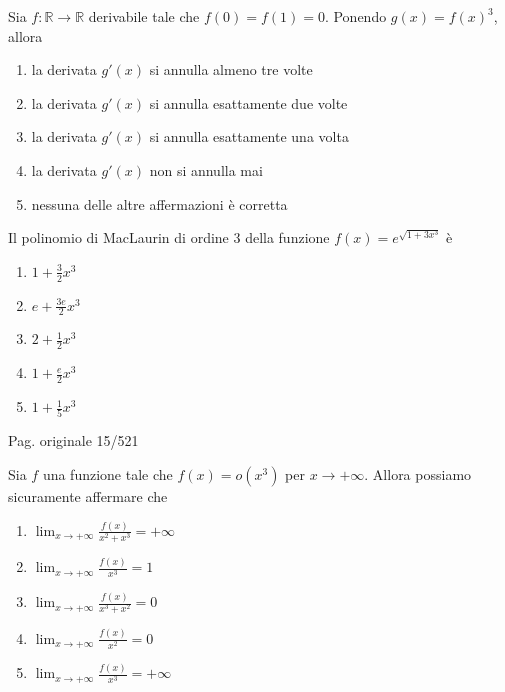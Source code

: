 \begin{quiz}
Sia $f:\mathbb R\to\mathbb R$ derivabile tale che $f(0)=f(1)=0$. Ponendo $g(x)=f(x)^3$, allora
\begin{enumerate}[label=\alph*),leftmargin=1.3cm,itemsep=3pt,topsep=5pt]
\item la derivata $g\prime(x)$ si annulla almeno tre volte
\item la derivata $g\prime(x)$ si annulla esattamente due volte
\item la derivata $g\prime(x)$ si annulla esattamente una volta
\item la derivata $g\prime(x)$ non si annulla mai
\item nessuna delle altre affermazioni \`e corretta
\end{enumerate}
\end{quiz}

\begin{quiz}
Il polinomio di MacLaurin di ordine 3 della funzione $f(x)=e^{\sqrt{1+3x^3}}$ \`e
\begin{enumerate}[label=\alph*),leftmargin=1.3cm,itemsep=3pt,topsep=5pt]
\item $1+\frac32x^3$
\item $e+\frac{3e}{2}x^3$
\item $2+\frac12x^3$
\item $1+\frac e2x^3$
\item $1+\frac15x^3$
\end{enumerate}
\end{quiz}

\par\noindent\hfill{\color{cyan!65!black}\scriptsize Pag. originale 15/521}\par\smallskip

\begin{quiz}
Sia $f$ una funzione tale che $f(x)=o(x^3)$ per $x\to+\infty$. Allora possiamo sicuramente affermare che
\begin{enumerate}[label=\alph*),leftmargin=1.3cm,itemsep=3pt,topsep=5pt]
\item $\lim_{x\to+\infty}\frac{f(x)}{x^2+x^3}=+\infty$
\item $\lim_{x\to+\infty}\frac{f(x)}{x^3}=1$
\item $\lim_{x\to+\infty}\frac{f(x)}{x^3+x^2}=0$
\item $\lim_{x\to+\infty}\frac{f(x)}{x^2}=0$
\item $\lim_{x\to+\infty}\frac{f(x)}{x^3}=+\infty$
\end{enumerate}
\end{quiz}

